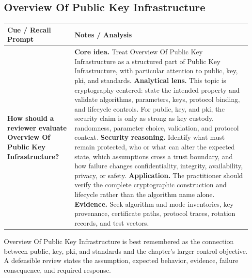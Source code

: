 \documentclass[11pt]{article}
\newcommand{\CornellHeader}{%
\rowcolor{Navy}\color{white}\bfseries Cue / Recall Prompt & \color{white}\bfseries Notes / Analysis\\\hline}
\newcommand{\CornellRow}[2]{%
\cellcolor{CueGray}\RaggedRight\textbf{#1} & \RaggedRight #2\\\hline}
\begin{document}
\subsection*{Overview Of Public Key Infrastructure}
\begin{longtable}{>{\RaggedRight\arraybackslash}p{}|>{\RaggedRight\arraybackslash}p{}}
\CornellHeader
\CornellRow{How should a reviewer evaluate Overview Of Public Key Infrastructure?}{\textbf{Core idea.} Treat Overview Of Public Key Infrastructure as a structured part of Public Key Infrastructure, with particular attention to public, key, pki, and standards. \textbf{Analytical lens.} This topic is cryptography-centered: state the intended property and validate algorithms, parameters, keys, protocol binding, and lifecycle controls. For public, key, and pki, the security claim is only as strong as key custody, randomness, parameter choice, validation, and protocol context. \textbf{Security reasoning.} Identify what must remain protected, who or what can alter the expected state, which assumptions cross a trust boundary, and how failure changes confidentiality, integrity, availability, privacy, or safety. \textbf{Application.} The practitioner should verify the complete cryptographic construction and lifecycle rather than the algorithm name alone. \textbf{Evidence.} Seek algorithm and mode inventories, key provenance, certificate paths, protocol traces, rotation records, and test vectors.}
\end{longtable}
\begin{topicsummary}
Overview Of Public Key Infrastructure is best remembered as the connection between public, key, pki, and standards and the chapter's larger control objective. A defensible review states the assumption, expected behavior, evidence, failure consequence, and required response.
\end{topicsummary}
\end{document}
